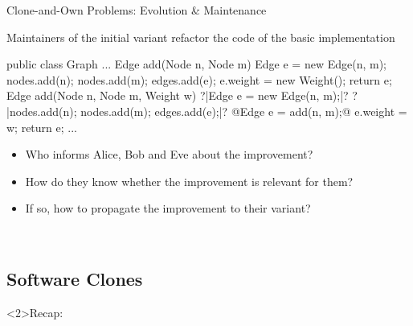 \begin{frame}[fragile]{Clone-and-Own Problems: Evolution \& Maintenance}
	\begin{fancycolumns}[b,widths={43}]
		\begin{example}{}
			Maintainers of the initial variant refactor the code of the basic implementation
		\end{example}
\begin{codetight}{}
public class Graph {
	...
	Edge add(Node n, Node m) {
		Edge e = new Edge(n, m);
		nodes.add(n); nodes.add(m); edges.add(e);
		e.weight = new Weight();
		return e;
	}
	Edge add(Node n, Node m, Weight w) {
		?|Edge e = new Edge(n, m);|?
		?|nodes.add(n); nodes.add(m); edges.add(e);|?
		@Edge e = add(n, m);@
		e.weight = w;
		return e;
	}
	...
}
\end{codetight} %
	\nextcolumn
		\begin{note}{}
			\begin{itemize}
				\item Who informs Alice, Bob and Eve about the improvement?
				\item How do they know whether the improvement is relevant for them?
				\item If so, how to propagate the improvement to their variant?
			\end{itemize}
		\end{note}

		~

		\hfill
		\hfill
	\end{fancycolumns}
\end{frame}

\subsection{Software Clones}

\begin{frame}<2>{Recap: \myframetitle\ \mytitlesource{\lectureintroduction}}
	\frameSoftwareClones
\end{frame}


